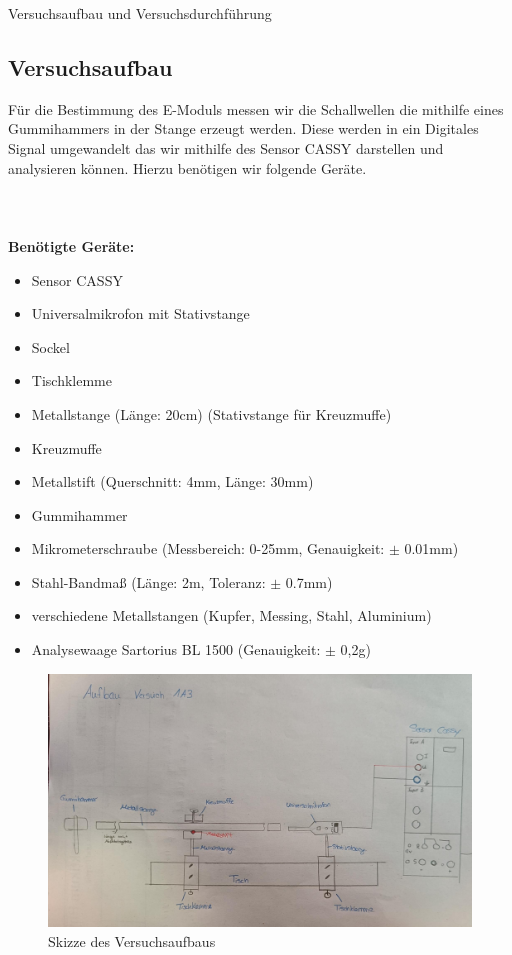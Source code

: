 \documentclass[twoside]{protokoll}
\begin{document}
\begin{aufgabe}{Versuchsaufbau und Versuchsdurchführung}
\subsection{Versuchsaufbau}
  Für die Bestimmung des E-Moduls messen wir die Schallwellen die mithilfe eines Gummihammers in der Stange erzeugt werden.
    Diese werden in ein Digitales Signal umgewandelt das wir mithilfe des Sensor CASSY darstellen und analysieren können.
    Hierzu benötigen wir folgende Geräte.\\\\\\\\


\textbf{Benötigte Geräte:}
\begin{itemize}
\item Sensor CASSY
\item Universalmikrofon mit Stativstange
\item Sockel
\item Tischklemme
\item Metallstange (Länge: 20cm) (Stativstange für Kreuzmuffe)
\item Kreuzmuffe
\item Metallstift (Querschnitt: 4mm, Länge: 30mm)
\item Gummihammer
\item Mikrometerschraube (Messbereich: 0-25mm, Genauigkeit: $\pm$ 0.01mm)
\item Stahl-Bandmaß (Länge: 2m, Toleranz: $\pm$ 0.7mm)
\item verschiedene Metallstangen (Kupfer, Messing, Stahl, Aluminium)
\item Analysewaage Sartorius BL 1500 (Genauigkeit: $\pm$ 0,2g)
\end{itemize}


\begin{figure}[H]
  \centering
  \includegraphics[width=1\textwidth]{Bilder/434170_428396_1A3_SkizzeAufbau.pdf}
  \caption{Skizze des Versuchsaufbaus}
  \centering
\end{figure}
 

\end{aufgabe}
\end{document}
